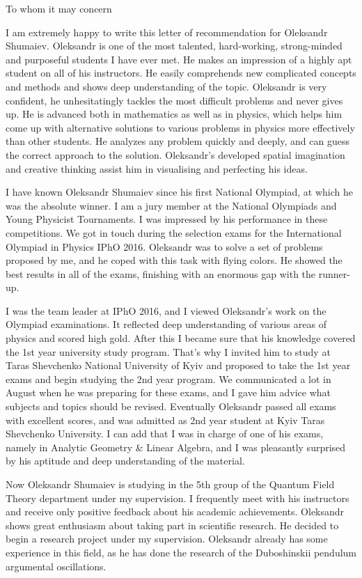 \documentclass[12pt,a4paper]{article}
\begin{document}
To whom it may concern

I am extremely happy to write this letter of recommendation for Oleksandr Shumaiev. Oleksandr is one of the most talented, hard-working, strong-minded and purposeful students I have ever met. He makes an impression of a highly apt student on all of his instructors. He easily comprehends new complicated concepts and methods and shows deep understanding of the topic. Oleksandr is very confident, he unhesitatingly tackles the most difficult problems and never gives up. He is advanced both in mathematics as well as in physics, which helps him come up with alternative solutions to various problems in physics more effectively than other students. He analyzes any problem quickly and deeply, and can guess the correct approach to the solution. Oleksandr's developed spatial imagination and creative thinking assist him in visualising and perfecting his ideas.

I have known Oleksandr Shumaiev since his first National Olympiad, at which he was the absolute winner. I am a jury member at the National Olympiads and Young Physicist Tournaments. I was impressed by his performance in these competitions. We got in touch during the selection exams for the International Olympiad in Physics IPhO 2016. Oleksandr was to solve a set of problems proposed by me, and he coped with this task with flying colors. He showed the best results in all of the exams, finishing with an enormous gap with the runner-up.

I was the team leader at IPhO 2016, and I viewed Oleksandr's work on the Olympiad examinations. It reflected deep understanding of various areas of physics and scored high gold. After this I became sure that his knowledge covered the 1st year university study program. That's why I invited him to study at Taras Shevchenko National University of Kyiv and proposed to take the 1st year exams and begin studying the 2nd year program. We communicated a lot in August when he was preparing for these exams, and I gave him advice what subjects and topics should be revised. Eventually Oleksandr passed all exams with excellent scores, and was admitted as 2nd year student at Kyiv Taras Shevchenko University. I can add that I was in charge of one of his exams, namely in Analytic Geometry \& Linear Algebra, and I was pleasantly surprised by his aptitude and deep understanding of the material.

Now Oleksandr Shumaiev is studying in the 5th group of the Quantum Field Theory department under my supervision. I frequently meet with his instructors and receive only positive feedback about his academic achievements. Oleksandr shows great enthusiasm about taking part in scientific research. He decided to begin a research project under my supervision. Oleksandr already has some experience in this field, as he has done the research of the Duboshinskii pendulum argumental oscillations.
\end{document}
